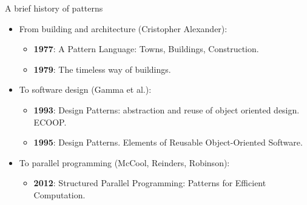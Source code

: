 \begin{frame}[t]{A brief history of patterns}
\begin{itemize}
\item From building and architecture (Cristopher Alexander):
\begin{itemize}
  \item \textbf{1977}: A Pattern Language: Towns, Buildings, Construction.
  \item \textbf{1979}: The timeless way of buildings.
\end{itemize}
\pause\vfill
\item To software design (Gamma et al.):
\begin{itemize}
  \item \textbf{1993}: Design Patterns: abstraction and reuse of object oriented design. ECOOP.
  \item \textbf{1995}: Design Patterns. Elements of Reusable Object-Oriented Software.
\end{itemize}
\pause\vfill
\item To parallel programming (McCool, Reinders, Robinson):
\begin{itemize}
  \item \textbf{2012}: Structured Parallel Programming: Patterns for Efficient Computation.
\end{itemize}
\end{itemize}
\end{frame}
